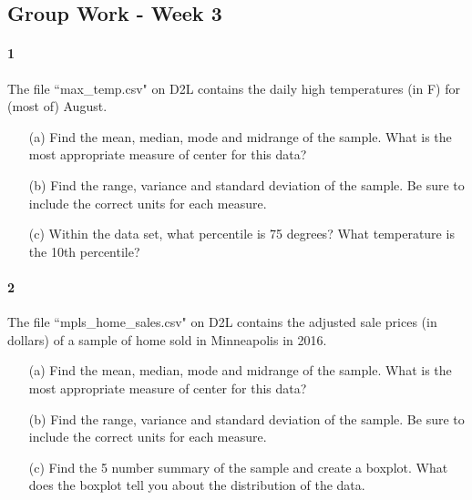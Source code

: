 \documentclass{article}
\begin{document}
\begin{flushleft}
\section*{Group Work - Week 3}
\paragraph{1} The file ``max\_temp.csv" on D2L contains the daily high temperatures (in F) for (most of) August. 
\begin{itemize}
\item [(a)] Find the mean, median, mode and midrange of the sample. What is the most appropriate measure of center for this data?
\vspace{2.25in}
\item[(b)] Find the range, variance and standard deviation of the sample. Be sure to include the correct units for each measure.
\vspace{2.25in}
\item[(c)] Within the data set, what percentile is 75 degrees? What temperature is the 10th percentile?
\end{itemize}



\newpage
\paragraph{2} The file ``mpls\_home\_sales.csv" on D2L contains the adjusted sale prices (in dollars) of a sample of home sold in Minneapolis in 2016. 
\begin{itemize}
\item [(a)] Find the mean, median, mode and midrange of the sample. What is the most appropriate measure of center for this data?
\vspace{2.25in}
\item[(b)] Find the range, variance and standard deviation of the sample. Be sure to include the correct units for each measure.
\vspace{2.25in}
\item[(c)] Find the 5 number summary of the sample and create a boxplot. What does the boxplot tell you about the distribution of the data.
\end{itemize}

\newpage

\end{flushleft}
\end{document}
